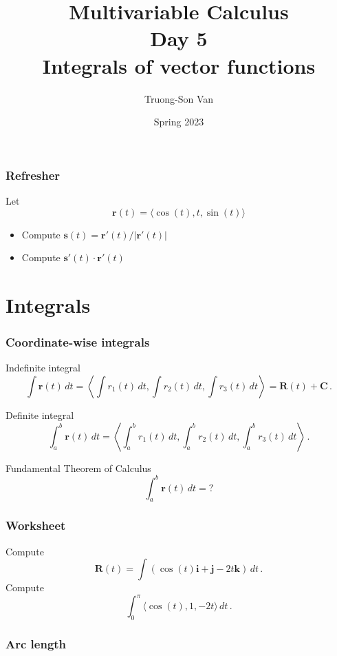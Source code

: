 \documentclass[aspectratio=169]{beamer}
\title{ Multivariable Calculus \\ Day 5 \\ Integrals of vector functions}
\institute{Fulbright University Vietnam}
\author{Truong-Son Van}
\date{Spring 2023}
\newcommand{\vect}{\mathbf}
\begin{document}
\maketitle

\begin{frame}
    \frametitle{Refresher}
    Let 
    $$\vect{r}(t) = \langle \cos(t), t, \sin(t) \rangle$$
    \begin{itemize}
        \item Compute $\vect{s}(t)=\vect{r}'(t)/|\vect{r}'(t)|$
        \item Compute $\vect{s}'(t)\cdot \vect{r}'(t)$
    \end{itemize}

\end{frame}


\section{Integrals}

\begin{frame}
    \frametitle{Coordinate-wise integrals}
    Indefinite integral
\begin{equation*}
    \int \vect{r}(t) \, dt = \left\langle \int r_1(t) \, dt, \int r_2(t) \, dt, \int r_3(t) \, dt \right\rangle = \vect{R}(t) + \vect{C} \,. 
\end{equation*}

Definite integral
\begin{equation*}
    \int_a^b \vect{r}(t) \, dt = \left\langle \int_a^b r_1(t) \, dt, \int_a^b r_2(t) \, dt, \int_a^b r_3(t) \, dt \right\rangle \,. 
\end{equation*}

Fundamental Theorem of Calculus
\begin{equation*}
    \int_a^b \vect{r}(t) \, dt =  ?
\end{equation*}
\end{frame}

\begin{frame}
    \frametitle{Worksheet}
    Compute
         $$\vect{R}(t) = \int (\cos(t)\vect{i} + \vect{j} - 2t\vect{k}) \, dt \,.$$
    Compute 
        $$\int_0^\pi \langle \cos(t), 1, -2t  \rangle \, dt \,. $$
\end{frame}



\begin{frame}
    \frametitle{ Arc length}
\end{frame}
\end{document}
